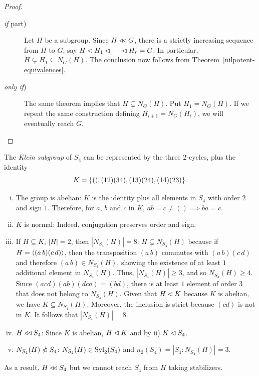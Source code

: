 \begin{proof}\ 

\begin{description}
    \item[\normalfont\textit{if\/} part)] Let $H$ be a subgroup. Since $H\mathrel{\triangleleft\triangleleft} G$, there is a strictly increasing sequence from $H$ to $G$, say $H\lhd H_1\lhd\cdots\lhd H_r=G$. In particular, $H\varsubsetneq H_1\subseteq N_G(H)$. The conclusion now follows from Theorem~\ref{nilpotent-equivalences}.

    \item[\normalfont\textit{only if\/})] The same theorem implies that $H\varsubsetneq N_G(H)$. Put $H_1=N_G(H)$. If we repeat the same construction defining $H_{i+1}=N_G(H_i)$, we will eventually reach $G$.
\end{description}
\end{proof}

\begin{xmpl}
    The \textsl{Klein subgroup} of\/ $S_4$ can be represented by the three $2$-cycles, plus the identity 
    $$
        K = \{(),(1 2)(3 4), (1 3)(2 4), (1 4)(2 3)\}.
    $$
    \begin{enumerate}[i),font=\upshape]
        \item The group is abelian{\upshape: $K$ is the identity plus all elements in $S_4$ with order $2$ and sign $1$. Therefore, for $a$, $b$ and $c$ in $K$, $ab=c\ne()\implies ba=c$.}
        
        \item $K$ is normal{\upshape: Indeed, conjugation preserves order and sign.}
        
        \item If\/ $H\subseteq K$, $|H|=2$, then $|N_{S_4}(H)|=8${\upshape: $H\varsubsetneq N_{S_4}(H)$ because if\/ $H=\langle(a\,b)(c\,d)\rangle$, then the transposition\/ $(a\,b)$ commutes with\/ $(a\,b)(c\,d)$ and therefore\/ $(a\,b) \in N_{S_4}(H)$, showing the existence of at least\/ $1$ additional element in\/ $N_{S_4}(H)$. Thus, $|N_{S_4}(H)|\ge3$, and so\/ $N_{S_4}(H)\ge4$. Since $(acd)(ab)(dca)=(bd)$, there is at least $1$ element of order $3$ that does not belong to $N_{S_4}(H)$. Given that $H\lhd K$ because $K$ is abelian, we have $K\subseteq N_{S_4}(H)$. Moreover, the inclusion is strict because $(cd)$ is not in $K$. It follows that $|N_{S_4}(H)|=8$.}
    
        \item $H\mathrel{\triangleleft\triangleleft} S_4${\upshape: Since\/ $K$ is abelian, $H\lhd K$ and by ii) $K\lhd S_4$.}
    
        \item $N_{S_4}(H)\nnormal S_4${\upshape: $N_{S_4}(H)\in{\rm Syl}_2(S_4)$ and $n_2(S_4)=|S_4:N_{S_4}(H)|=3$.}
    \end{enumerate}
    As a result, $H\mathrel{\triangleleft\triangleleft} S_4$ but we cannot reach $S_4$ from $H$ taking stabilizers.
\end{xmpl}


